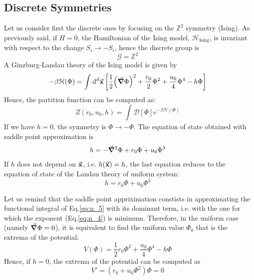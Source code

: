 \documentclass[../../Main/Main.tex]{subfiles}
\begin{document}
\subsection{Discrete Symmetries}

Let us consider first the discrete ones by focusing on the \( \mathbb{Z}^2 \) symmetry (Ising).
As previously said, if \( H=0 \), the Hamiltonian of the Ising model, \( \mathcal{H}_{\text{Ising}} \), is invariant with respect to the change \( S_i \rightarrow -S_i \), hence the discrete group is
\begin{equation*}
  \mathcal{G} = \mathbb{Z}^2
\end{equation*}
A Ginzburg-Landau theory of the Ising model is given by
\begin{equation}
   -\beta \mathcal{H} (\Phi ) = \int_{}^{} \dd[d]{\va{x}} \qty[ \frac{1}{2} \qty(\va{\grad } \Phi )^2 + \frac{r_0}{2} \Phi ^2 + \frac{u_0}{4} \Phi ^4 - h \Phi ]
  \label{eq:n_4}
\end{equation}
Hence, the partition function can be computed as:
\begin{equation}
  Z (r_0,u_0,h) = \int_{}^{} \mathcal{D} [\Phi]  e^{-\beta \mathcal{H} (\Phi )}
  \label{eq:n_5}
\end{equation}
If we have \( h=0 \), the symmetry is \( \Phi \rightarrow - \Phi  \).
The equation of state obtained with saddle point approximation is
\begin{equation*}
  h = - \va{\grad } ^2 \Phi + r_0 \Phi + u_0 \Phi ^3
\end{equation*}
If \( h \) does not depend on \( \va{x} \), i.e. \( h(\va{x})=h \), the last equation reduces to the equation of state of the Landau theory of uniform system:
\begin{equation*}
  h =  r_0 \Phi + u_0 \Phi ^3
\end{equation*}

Let us remind that the saddle point appriximation constists in approximating the functional integral of Eq.\eqref{eq:n_5} with its dominant term, i.e. with the one for which the exponent (Eq.\eqref{eq:n_4}) is minimum. Therefore, in the uniform case (namely \( \va{\grad } \Phi = 0 \)), it is equivalent to find the uniform value \( \Phi _0 \)  that is the extrema of the potential:
\begin{equation*}
  V (\Phi ) = \frac{1}{2} r_0 \Phi ^2 + \frac{u_0}{4} \Phi ^4 - h \Phi
\end{equation*}
Hence, if \( h=0 \), the extrema of the potential can be computed as
\begin{equation*}
  V' = (r_0 + u_0 \Phi ^2) \Phi = 0
\end{equation*}
\end{document}
